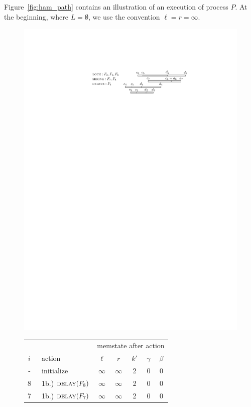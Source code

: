  Figure~\ref{fig:ham_path} contains an illustration of an execution of process $P$.
At the beginning, where $L = \emptyset$, we use the convention $\ell = r = \infty$. 
\begin{figure}
\centering
\includegraphics[scale=1]{chapter-3-interdiction/figure_ham_path}
\begin{tabular}{cl|ccccc}
    && \multicolumn{5}{c}{memstate after action}\\
    $i$ & \ action & $\ell$ & $r$ & $k'$ & $\gamma$ & $\beta$ \\ 
    \hline
    - & \ initialize & $\infty$ & $\infty$ & 2 & 0 & 0 \\
    8 & \ 1b.) $\textsc{delay}(F_8)$ & $\infty$ & $\infty$ & 2 & 0 & 0\\
    7 & \ 1b.) $\textsc{delay}(F_7)$ & $\infty$ & $\infty$ & 2 & 0 & 0\\

\end{tabular}
\end{figure}
